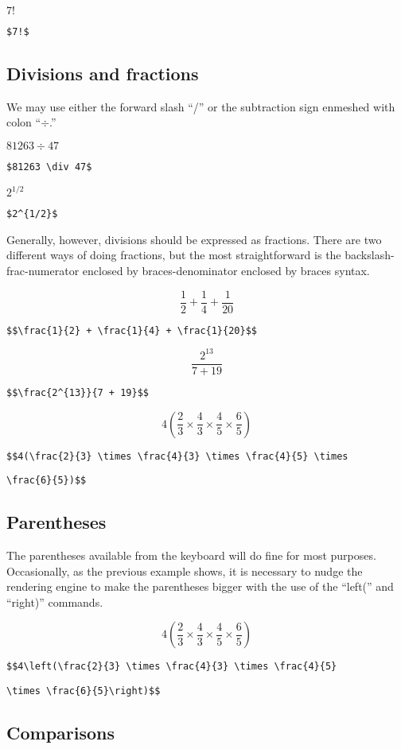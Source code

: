 $7!$

\verb'$7!$'

\subsection{Divisions and fractions}

We may use either the forward slash ``/'' or the subtraction sign enmeshed with colon ``$\div$.''

$81263 \div 47$

\verb=$81263 \div 47$=

$2^{1/2}$

\verb=$2^{1/2}$=

Generally, however, divisions should be expressed as fractions. There are two different ways of doing fractions, but the most straightforward is the backslash-frac-numerator enclosed by braces-denominator enclosed by braces syntax.

$$\frac{1}{2} + \frac{1}{4} + \frac{1}{20}$$

\verb=$$\frac{1}{2} + \frac{1}{4} + \frac{1}{20}$$=

$$\frac{2^{13}}{7 + 19}$$

\verb=$$\frac{2^{13}}{7 + 19}$$=

$$4(\frac{2}{3} \times \frac{4}{3} \times \frac{4}{5} \times \frac{6}{5})$$

\verb=$$4(\frac{2}{3} \times \frac{4}{3} \times \frac{4}{5} \times=

\verb=\frac{6}{5})$$=

\subsection{Parentheses}

The parentheses available from the keyboard will do fine for most purposes. Occasionally, as the previous example shows, it is necessary to nudge the rendering engine to make the parentheses bigger with the use of the ``left('' and ``right)'' commands.

$$4\left(\frac{2}{3} \times \frac{4}{3} \times \frac{4}{5} \times \frac{6}{5}\right)$$

\verb=$$4\left(\frac{2}{3} \times \frac{4}{3} \times \frac{4}{5}=

\verb=\times \frac{6}{5}\right)$$=

\subsection{Comparisons}

